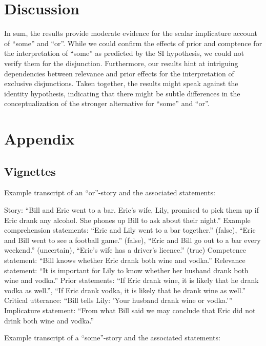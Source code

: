 \documentclass{sp}
\begin{document}
\section{Discussion}
In sum, the results provide moderate evidence for the scalar implicature account of ``some'' and ``or''. While we could confirm the effects of prior and comptence for the interpretation of ``some'' as predicted by the SI hypothesis, we could not verify them for the disjunction. Furthermore, our results hint at intriguing dependencies between relevance and prior effects for the interpretation of exclusive disjunctions. Taken together, the results might speak against the identity hypothesis, indicating that there might be subtle differences in the conceptualization of the stronger alternative for ``some'' and ``or''.

\section{Appendix}
\subsection{Vignettes}
Example transcript of an “or”-story and the associated statements:

Story: “Bill and Eric went to a bar. Eric’s wife, Lily, promised to pick them up if Eric drank any alcohol. She phones up Bill to ask about their night.”
Example comprehension statements: “Eric and Lily went to a bar together.” (false), “Eric and Bill went to see a football game.” (false), “Eric and Bill go out to a bar every weekend.” (uncertain), “Eric's wife has a driver’s licence.” (true)
Competence statement: “Bill knows whether Eric drank both wine and vodka.”
Relevance statement: “It is important for Lily to know whether her husband drank both wine and vodka.”
Prior statements: “If Eric drank wine, it is likely that he drank vodka as well.”, “If Eric drank vodka, it is likely that he drank wine as well.”
Critical utterance: “Bill tells Lily: 'Your husband drank wine or vodka.'”
Implicature statement: “From what Bill said we may conclude that Eric did not drink both wine and vodka.”

Example transcript of a “some”-story and the associated statements:
\end{document}
